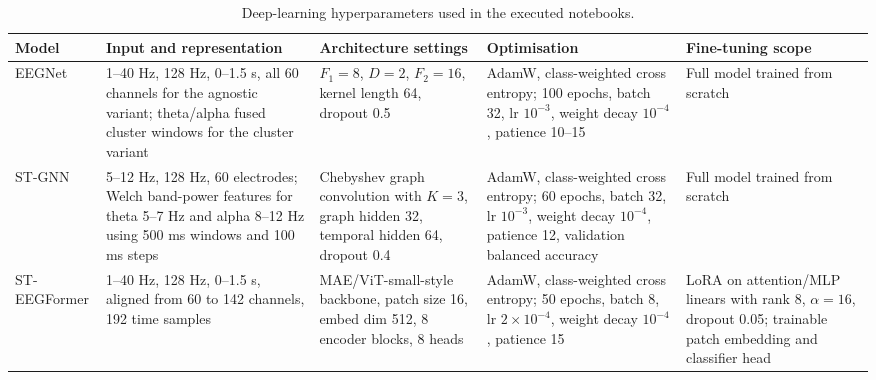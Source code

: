 \documentclass[11pt,a4paper,chapterprefix=false,parskip=false]{scrreprt}
\begin{document}
\begin{appendices}
    \begin{table}[H]
        \centering
        \scriptsize
        \caption{Deep-learning hyperparameters used in the executed notebooks.}
        \label{tab:dl-hyperparameters}
        \begin{tabularx}{\textwidth}{@{}lXXXX@{}}
            \toprule
            Model        & Input and representation                                                                                                              & Architecture settings                                                                       & Optimisation                                                                                                                                      & Fine-tuning scope                                                                                                            \\
            \midrule
            EEGNet       & 1--40 Hz, 128 Hz, 0--1.5 s, all 60 channels for the agnostic variant; theta/alpha fused cluster windows for the cluster variant       & $F_1=8$, $D=2$, $F_2=16$, kernel length 64, dropout 0.5                                     & AdamW, class-weighted cross entropy; 100 epochs, batch 32, lr $10^{-3}$, weight decay $10^{-4}$, patience 10--15                                  & Full model trained from scratch                                                                                              \\
            ST-GNN       & 5--12 Hz, 128 Hz, 60 electrodes; Welch band-power features for theta 5--7 Hz and alpha 8--12 Hz using 500 ms windows and 100 ms steps & Chebyshev graph convolution with $K=3$, graph hidden 32, temporal hidden 64, dropout 0.4    & AdamW, class-weighted cross entropy; 60 epochs, batch 32, lr $10^{-3}$, weight decay $10^{-4}$, patience 12, validation balanced accuracy         & Full model trained from scratch                                                                                              \\
            ST-EEGFormer & 1--40 Hz, 128 Hz, 0--1.5 s, aligned from 60 to 142 channels, 192 time samples                                                         & MAE/ViT-small-style backbone, patch size 16, embed dim 512, 8 encoder blocks, 8 heads       & AdamW, class-weighted cross entropy; 50 epochs, batch 8, lr $2 \times 10^{-4}$, weight decay $10^{-4}$, patience 15                               & LoRA on attention/MLP linears with rank 8, $\alpha=16$, dropout 0.05; trainable patch embedding and classifier head          \\

\end{tabularx}
\end{table}
\end{appendices}
\end{document}
